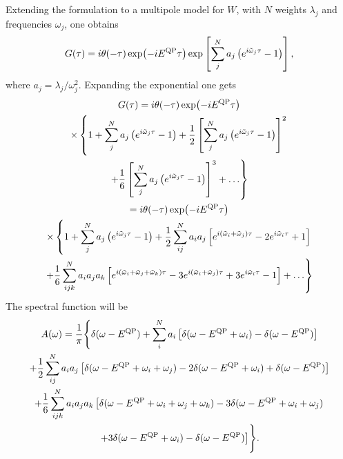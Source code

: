 \documentclass[a4paper,12pt]{article}
\def\be{\begin{equation}}
\def\ee{\end{equation}}
\begin{document}
Extending the formulation to a multipole model for $W$, with $N$ weights $\lambda_j$ and frequencies $\omega_j$, one obtains 
\be
   {G} ( \tau ) =  i \theta ( -\tau ) 
  \exp\! \left( - i E^\textnormal{QP} \tau \right)
  \exp\left[ \sum_j^N a_j \left(  e^{i\tilde\omega_j \tau } - 1 
      \right)  \right] ,
\ee
where $ a_j = \lambda_j/\omega_j^2 $. 
Expanding the exponential one gets
\begin{multline}
   {G} ( \tau ) =  i \theta ( -\tau ) 
  \exp\! \left( - i E^\textnormal{QP} \tau \right) \\
 \times \left\{ 1 + 
    \sum_j^N a_j \left(  e^{i\tilde\omega_j \tau } - 1  \right) 
  + \frac12 \left[ \sum_j^N a_j \left(  e^{i\tilde\omega_j \tau } - 1  \right)  \right]^2  \right. \\
  \left.  + \frac16  \left[ \sum_j^N a_j \left(  e^{i\tilde\omega_j \tau } - 1  \right)  \right]^3  
  + \ldots  \right\} \\
 =   i \theta ( -\tau ) 
  \exp\! \left( - i E^\textnormal{QP} \tau \right) \\
 \times \left\{ 1 + 
    \sum_j^N a_j \left(  e^{i\tilde\omega_j \tau } - 1  \right) 
   + \frac12 \sum_{ij}^N a_i a_j \left[  e^{i (\tilde\omega_i + \tilde\omega_j) \tau } 
   - 2 e^{i \tilde\omega_i \tau} + 1   \right]  \right. \\
 \left.   + \frac16 \sum_{ijk}^N a_i a_j a_k \left[ e^{i (\tilde\omega_i + \tilde\omega_j + \tilde\omega_k) \tau } 
  - 3  e^{i (\tilde\omega_i + \tilde\omega_j) \tau } 
   + 3 e^{i \tilde\omega_i \tau} - 1   \right] 
  + \ldots  \right\} \\
\end{multline}
The spectral function will be
\begin{multline}
 A(\omega) = \frac1\pi \Biggl\{ \delta(\omega-E^\textnormal{QP}) 
 + \sum_i^N a_i \left[ \delta(\omega-E^\textnormal{QP}+\omega_i) 
  - \delta(\omega-E^\textnormal{QP}) \right] \\
  + \frac12 \sum_{ij}^N a_i a_j \left[ \delta(\omega - E^\textnormal{QP} + \omega_i + \omega_j) 
 - 2 \delta(\omega-E^\textnormal{QP}+\omega_i) + \delta(\omega-E^\textnormal{QP}) \right] \\
  + \frac16 \sum_{ijk}^N a_i a_j a_k 
   \left[ \delta(\omega - E^\textnormal{QP} + \omega_i + \omega_j + \omega_k) 
  - 3 \delta(\omega - E^\textnormal{QP} + \omega_i + \omega_j) \right. \\ 
   \left. + 3 \delta(\omega-E^\textnormal{QP}+\omega_i) 
   - \delta(\omega-E^\textnormal{QP}) \right] \Biggr\} .
\end{multline}
\end{document}
